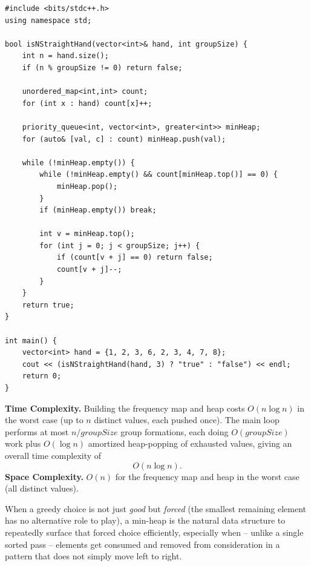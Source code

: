 \begin{lstlisting}
#include <bits/stdc++.h>
using namespace std;

bool isNStraightHand(vector<int>& hand, int groupSize) {
    int n = hand.size();
    if (n % groupSize != 0) return false;

    unordered_map<int,int> count;
    for (int x : hand) count[x]++;

    priority_queue<int, vector<int>, greater<int>> minHeap;
    for (auto& [val, c] : count) minHeap.push(val);

    while (!minHeap.empty()) {
        while (!minHeap.empty() && count[minHeap.top()] == 0) {
            minHeap.pop();
        }
        if (minHeap.empty()) break;

        int v = minHeap.top();
        for (int j = 0; j < groupSize; j++) {
            if (count[v + j] == 0) return false;
            count[v + j]--;
        }
    }
    return true;
}

int main() {
    vector<int> hand = {1, 2, 3, 6, 2, 3, 4, 7, 8};
    cout << (isNStraightHand(hand, 3) ? "true" : "false") << endl;
    return 0;
}
\end{lstlisting}

\begin{complexitybox}
\textbf{Time Complexity.} Building the frequency map and heap costs
$O(n \log n)$ in the worst case (up to $n$ distinct values, each pushed
once). The main loop performs at most $n/\textit{groupSize}$ group
formations, each doing $O(\textit{groupSize})$ work plus
$O(\log n)$ amortized heap-popping of exhausted values, giving an overall
time complexity of
\[
  O(n \log n).
\]
\textbf{Space Complexity.} $O(n)$ for the frequency map and heap in the
worst case (all distinct values).
\end{complexitybox}

\begin{takeawaybox}
When a greedy choice is not just \emph{good} but \emph{forced} (the
smallest remaining element has no alternative role to play), a min-heap
is the natural data structure to repeatedly surface that forced choice
efficiently, especially when -- unlike a single sorted pass -- elements
get consumed and removed from consideration in a pattern that does not
simply move left to right.
\end{takeawaybox}
